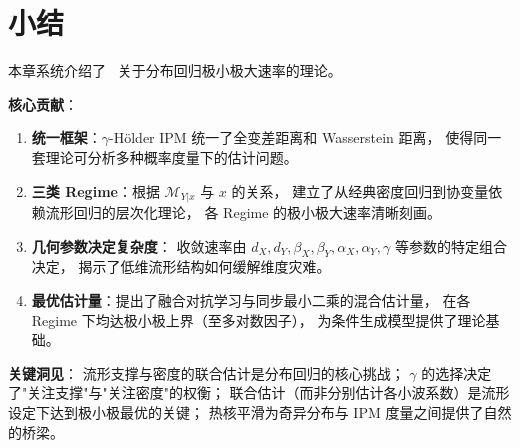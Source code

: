 \section{小结}\label{sec:ch2-summary}

本章系统介绍了~\citep{tang2025regression} 关于分布回归极小极大速率的理论。

\textbf{核心贡献}：

\begin{enumerate}
    \item \textbf{统一框架}：$\gamma$-Hölder IPM 统一了全变差距离和 Wasserstein 距离，
          使得同一套理论可分析多种概率度量下的估计问题。
    \item \textbf{三类 Regime}：根据 $\mathcal{M}_{Y|x}$ 与 $x$ 的关系，
          建立了从经典密度回归到协变量依赖流形回归的层次化理论，
          各 Regime 的极小极大速率清晰刻画。
    \item \textbf{几何参数决定复杂度}：
          收敛速率由 $d_X, d_Y, \beta_X, \beta_Y, \alpha_X, \alpha_Y, \gamma$
          等参数的特定组合决定，
          揭示了低维流形结构如何缓解维度灾难。
    \item \textbf{最优估计量}：提出了融合对抗学习与同步最小二乘的混合估计量，
          在各 Regime 下均达极小极上界（至多对数因子），
          为条件生成模型提供了理论基础。
\end{enumerate}

\textbf{关键洞见}：
流形支撑与密度的联合估计是分布回归的核心挑战；
$\gamma$ 的选择决定了"关注支撑"与"关注密度"的权衡；
联合估计（而非分别估计各小波系数）是流形设定下达到极小极最优的关键；
热核平滑为奇异分布与 IPM 度量之间提供了自然的桥梁。
